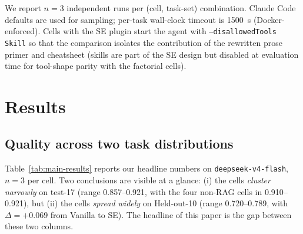 \documentclass{article}
\begin{document}
We report $n=3$ independent runs per (cell, task-set) combination. Claude Code defaults are used for sampling; per-task wall-clock timeout is 1500~s (Docker-enforced). Cells with the SE plugin start the agent with \texttt{--disallowedTools Skill} so that the comparison isolates the contribution of the rewritten prose primer and cheatsheet (skills are part of the SE design but disabled at evaluation time for tool-shape parity with the factorial cells).


\section{Results}
\label{sec:results}

\subsection{Quality across two task distributions}
\label{subsec:quality}

Table~\ref{tab:main-results} reports our headline numbers on \texttt{deepseek-v4-flash}, $n=3$ per cell. Two conclusions are visible at a glance: (i) the cells \emph{cluster narrowly} on test-17 (range 0.857--0.921, with the four non-RAG cells in 0.910--0.921), but (ii) the cells \emph{spread widely} on Held-out-10 (range 0.720--0.789, with $\Delta = +0.069$ from Vanilla to SE). The headline of this paper is the gap between these two columns.
\end{document}
